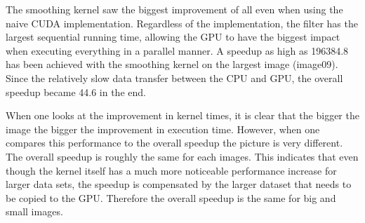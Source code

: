 \documentclass[final]{report}
\begin{document}
The smoothing kernel saw the biggest improvement of all even when using the naive CUDA implementation.
Regardless of the implementation, the filter has the largest sequential running time, allowing the GPU to have the biggest impact when executing everything in a parallel manner.
A speedup as high as 196384.8 has been achieved with the smoothing kernel on the largest image (image09).
Since the relatively slow data transfer between the CPU and GPU, the overall speedup became 44.6 in the end.

When one looks at the improvement in kernel times, it is clear that the bigger the image the bigger the improvement in execution time.
However, when one compares this performance to the overall speedup the picture is very different.
The overall speedup is roughly the same for each images.
This indicates that even though the kernel itself has a much more noticeable performance increase for larger data sets, the speedup is compensated by the larger dataset that needs to be copied to the GPU.
Therefore the overall speedup is the same for big and small images.
\end{document}
